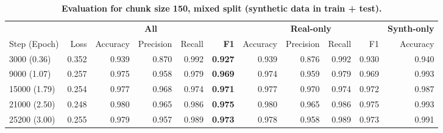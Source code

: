 \begin{table}[H]
\centering
\small
\caption[Evaluation for Chunk Size 150, Mixed Split]{\textbf{Evaluation for chunk size 150, mixed split (synthetic data in train + test).}}
\label{tab:150_mixed}
\begin{tabular}{@{}l *{10}{r} @{}}
\toprule
  & \multicolumn{5}{c}{\textbf{All}} 
  & \multicolumn{4}{c}{\textbf{Real-only}} 
  & \multicolumn{1}{c}{\textbf{Synth-only}} \\
\cmidrule(lr){2-6} \cmidrule(lr){7-10} \cmidrule(lr){11-11}
Step (Epoch) 
& Loss & Accuracy & Precision & Recall & \textbf{F1}
& Accuracy & Precision & Recall & F1
& Accuracy \\
\midrule
3000 (0.36) & 0.352 & 0.939 & 0.870 & 0.992 & \textbf{0.927} & 0.939 & 0.876 & 0.992 & 0.930 & 0.940 \\
9000 (1.07) & 0.257 & 0.975 & 0.958 & 0.979 & \textbf{0.969} & 0.974 & 0.959 & 0.979 & 0.969 & 0.993 \\
15000 (1.79) & 0.254 & 0.977 & 0.968 & 0.974 & \textbf{0.971} & 0.977 & 0.970 & 0.974 & 0.972 & 0.987 \\
21000 (2.50) & 0.248 & 0.980 & 0.965 & 0.986 & \textbf{0.975} & 0.980 & 0.965 & 0.986 & 0.975 & 0.993 \\
25200 (3.00) & 0.255 & 0.979 & 0.957 & 0.989 & \textbf{0.973} & 0.978 & 0.958 & 0.989 & 0.973 & 0.991 \\
\bottomrule
\end{tabular}
\end{table}
